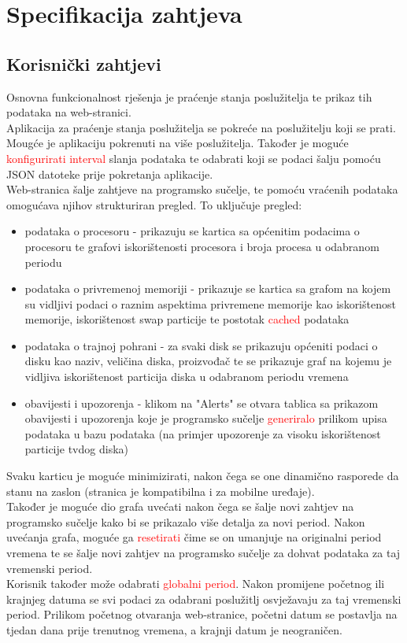 \documentclass[zavrsnirad]{fer}
\begin{document}
\chapter{Specifikacija zahtjeva}
\label{pog:specifikacija_zahtjeva}

\section{Korisnički zahtjevi}
Osnovna funkcionalnost rješenja je praćenje stanja poslužitelja te prikaz tih podataka na web-stranici.
\\Aplikacija za praćenje stanja poslužitelja se pokreće na poslužitelju koji se prati. Mougće je aplikaciju pokrenuti na više poslužitelja. Također je moguće \textcolor{red}{konfigurirati interval } slanja podataka te odabrati koji se podaci šalju pomoću JSON datoteke prije pokretanja aplikacije.
\\Web-stranica šalje zahtjeve na programsko sučelje, te pomoću vraćenih podataka omogućava njihov strukturiran pregled. To uključuje pregled:
\begin{itemize}
	\item podataka o procesoru - prikazuju se kartica sa općenitim podacima o procesoru te grafovi iskorištenosti procesora i broja procesa u odabranom periodu
	\item podataka o privremenoj memoriji - prikazuje se kartica sa grafom na kojem su vidljivi podaci o raznim aspektima privremene memorije kao iskorištenost memorije, iskorištenost swap particije te postotak \textcolor{red}{cached} podataka
	\item podataka o trajnoj pohrani - za svaki disk se prikazuju općeniti podaci o disku kao naziv, veličina diska, proizvođač te se prikazuje graf na kojemu je vidljiva iskorištenost particija diska u odabranom periodu vremena
	\item obavijesti i upozorenja - klikom na "Alerts" se otvara tablica sa prikazom obavijesti i upozorenja koje je programsko sučelje \textcolor{red}{generiralo} prilikom upisa podataka u bazu podataka (na primjer upozorenje za visoku iskorištenost particije tvdog diska)
\end{itemize}
Svaku karticu je moguće minimizirati, nakon čega se one dinamično rasporede da stanu na zaslon (stranica je kompatibilna i za mobilne uređaje).
\\Također je moguće dio grafa uvećati nakon čega se šalje novi zahtjev na programsko sučelje kako bi se prikazalo više detalja za novi period. Nakon uvećanja grafa, moguće ga \textcolor{red}{resetirati} čime se on umanjuje na originalni period vremena te se šalje novi zahtjev na programsko sučelje za dohvat podataka za taj vremenski period.
\\Korisnik također može odabrati \textcolor{red}{globalni period}. Nakon promijene početnog ili krajnjeg datuma se svi podaci za odabrani poslužitlj osvježavaju za taj vremenski period. Prilikom početnog otvaranja web-stranice, početni datum se postavlja na tjedan dana prije trenutnog vremena, a krajnji datum je neograničen.
\end{document}
